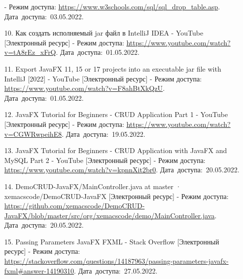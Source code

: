 \documentclass[12pt, a4paper, simple]{eskdtext}
\begin{document}
\begin{enumerate}
        - Режим доступа: \url{https://www.w3schools.com/sql/sql_drop_table.asp}.
        Дата~доступа:~03.05.2022.
        \item[10.] Как создать исполняемый jar файл в IntelliJ IDEA - YouTube [Электронный ресурс]
        - Режим доступа: \url{https://www.youtube.com/watch?v=tA8rEz_xFrQ}.
        Дата~доступа:~01.05.2022.
        \item[11.] Export JavaFX 11, 15 or 17 projects into an executable jar file with IntelliJ [2022] - YouTube [Электронный ресурс]
        - Режим доступа: \url{https://www.youtube.com/watch?v=F8ahBtXkQzU}.
        Дата~доступа:~01.05.2022.
        \item[12.] JavaFX Tutorial for Beginners - CRUD Application Part 1 - YouTube [Электронный ресурс]
        - Режим доступа: \url{https://www.youtube.com/watch?v=CGWRwpeihE8}.
        Дата~доступа:~19.05.2022.
        \item[13.] JavaFX Tutorial for Beginners - CRUD Application  with JavaFX and MySQL Part 2 - YouTube [Электронный ресурс]
        - Режим доступа: \url{https://www.youtube.com/watch?v=kpnnXit2br0}.
        Дата~доступа:~20.05.2022.
        \item[14.] DemoCRUD-JavaFX/MainController.java at master · xemacscode/DemoCRUD-JavaFX [Электронный ресурс]
        - Режим доступа: \url{https://github.com/xemacscode/DemoCRUD-JavaFX/blob/master/src/org/xemacscode/demo/MainController.java}.
        Дата~доступа:~20.05.2022.
        \item[15.] Passing Parameters JavaFX FXML - Stack Overflow [Электронный ресурс]
        - Режим доступа: \url{https://stackoverflow.com/questions/14187963/passing-parameters-javafx-fxml#answer-14190310}.
        Дата~доступа:~27.05.2022.
    \end{enumerate}
    \newpage
\end{document}
